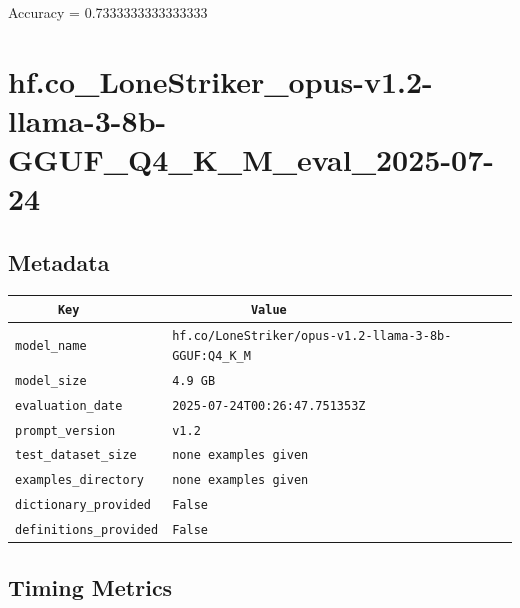\documentclass{article}
\begin{document}
\begin{center}
Accuracy = 0.7333333333333333
\end{center}

\section{hf.co\_LoneStriker\_opus-v1.2-llama-3-8b-GGUF\_Q4\_K\_M\_eval\_2025-07-24}
\subsection{Metadata}

\begin{center}
\begin{tabular}{l | l} \hline
    \verb|      Key      | & \verb|           Value           | \\ \hline
    \hline
    \verb|model_name    | & \verb|hf.co/LoneStriker/opus-v1.2-llama-3-8b-GGUF:Q4_K_M| \\ \hline
    \verb|model_size    | & \verb|4.9 GB                       | \\ \hline
    \verb|evaluation_date| & \verb|2025-07-24T00:26:47.751353Z  | \\ \hline
    \verb|prompt_version| & \verb|v1.2                         | \\ \hline
    \verb|test_dataset_size| & \verb|none examples given          | \\ \hline
    \verb|examples_directory| & \verb|none examples given          | \\ \hline
    \verb|dictionary_provided| & \verb|False                        | \\ \hline
    \verb|definitions_provided| & \verb|False                        | \\ \hline
\end{tabular}
\end{center}

\subsection{Timing Metrics}
\end{document}
